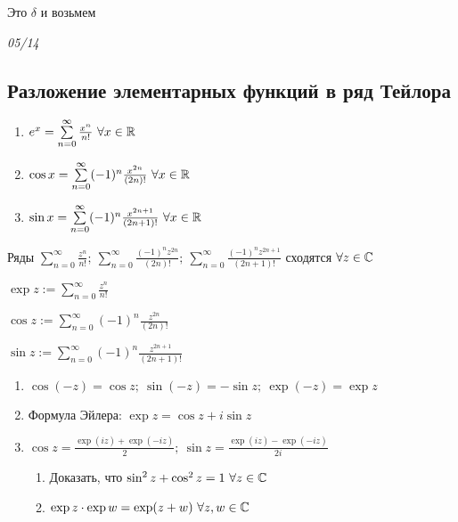 \documentclass[12pt]{article}
\begin{document}
Это $\delta$ и возьмем 

\newpage

\textit{05/14}

\subsection{Разложение элементарных функций в ряд Тейлора}

\begin{Reminder}{}
    \begin{enumerate}
        \item $e^x = \sum\limits_{n = 0}^\infty \frac{x^n}{n!}\ \forall x \in \mathbb R$
        \item $\cos{x} = \sum\limits_{n = 0}^\infty (-1)^n \frac{x^{2n}}{(2n)!}\ \forall x \in \mathbb R$
        \item $\sin{x} = \sum\limits_{n = 0}^\infty (-1)^n \frac{x^{2n + 1}}{(2n + 1)!}\ \forall x \in \mathbb R$
    \end{enumerate}
\end{Reminder}

\begin{Reminder}{}
    Ряды $\sum\limits_{n = 0}^\infty \frac{z^n}{n!};\ \sum\limits_{n = 0}^\infty \frac{(-1)^n z^{2n}}{(2n)!};\ \sum\limits_{n = 0}^\infty \frac{(-1)^n z^{2n + 1}}{(2n + 1)!}$ сходятся $\forall z \in \mathbb C$
\end{Reminder}

\begin{defin}{}
    $\exp{z} := \sum\limits_{n = 0}^\infty \frac{z^n}{n!}$

    $\cos{z} := \sum\limits_{n = 0}^\infty (-1)^n \frac{z^{2n}}{(2n)!}$

    $\sin{z} := \sum\limits_{n = 0}^\infty (-1)^n \frac{z^{2n + 1}}{(2n + 1)!}$
\end{defin}

\begin{Remark}{}
    \begin{enumerate}
        \item $\cos(-z) = \cos{z};\ \sin(-z) = -\sin{z};\ \exp(-z) = \exp{z}$
        \item Формула Эйлера: $\exp{z} = \cos{z} + i\sin{z}$
        \item $\cos{z} = \frac{\exp(iz) + \exp(-iz)}{2};\ \sin{z} = \frac{\exp(iz) - \exp(-iz)}{2i}$
        
        \begin{Exercise}{}
            \begin{enumerate}
                \item Доказать, что $\sin^2{z} + \cos^2{z} = 1\ \forall z \in \mathbb C$
                \item $\exp{z} \cdot \exp{w} = \exp(z + w)\ \forall z, w \in \C$
            \end{enumerate}
        \end{Exercise}
    \end{enumerate}
\end{Remark}
\end{document}
